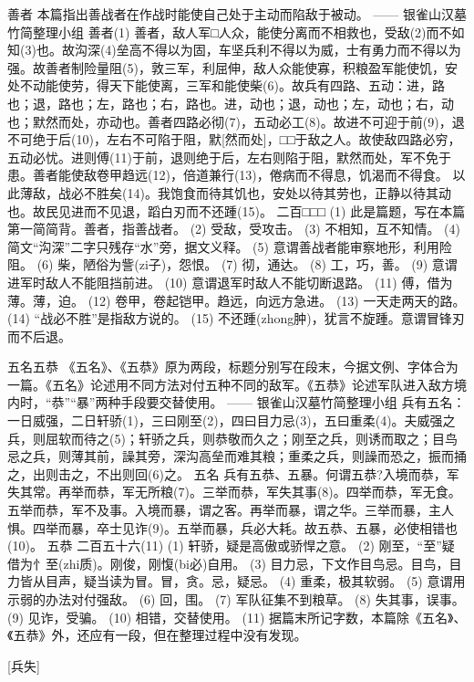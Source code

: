 \documentclass[12pt,UTF8]{ctexbook}
\begin{document}
善者
本篇指出善战者在作战时能使自己处于主动而陷敌于被动。
—— 银雀山汉墓竹简整理小组
善者(1)
善者，敌人军□人众，能使分离而不相救也，受敌(2)而不如知(3)也。故沟深(4)垒高不得以为固，车坚兵利不得以为威，士有勇力而不得以为强。故善者制险量阻(5)，敦三军，利屈伸，敌人众能使寡，积粮盈军能使饥，安处不动能使劳，得天下能使离，三军和能使柴(6)。故兵有四路、五动：进，路也；退，路也；左，路也；右，路也。进，动也；退，动也；左，动也；右，动也；默然而处，亦动也。善者四路必彻(7)，五动必工(8)。故进不可迎于前(9)，退不可绝于后(10)，左右不可陷于阻，默[然而处]，□□于敌之人。故使敌四路必穷，五动必忧。进则傅(11)于前，退则绝于后，左右则陷于阻，默然而处，军不免于患。善者能使敌卷甲趋远(12)，倍道兼行(13)，倦病而不得息，饥渴而不得食。
以此薄敌，战必不胜矣(14)。我饱食而待其饥也，安处以待其劳也，正静以待其动也。故民见进而不见退，蹈白刃而不还踵(15)。
二百□□□
(1) 此是篇题，写在本篇第一简简背。善者，指善战者。
(2) 受敌，受攻击。
(3) 不相知，互不知情。
(4) 简文“沟深”二字只残存“水”旁，据文义释。
(5) 意谓善战者能审察地形，利用险阻。
(6) 柴，陋俗为訾(zi子)，怨恨。
(7) 彻，通达。
(8) 工，巧，善。
(9) 意谓进军时敌人不能阻挡前进。
(10) 意谓退军时敌人不能切断退路。
(11) 傅，借为薄。薄，迫。
(12) 卷甲，卷起铠甲。趋远，向远方急进。
(13) 一天走两天的路。
(14) “战必不胜”是指敌方说的。
(15) 不还踵(zhong肿)，犹言不旋踵。意谓冒锋刃而不后退。

五名五恭
《五名》、《五恭》原为两段，标题分别写在段末，今据文例、字体合为一篇。《五名》论述用不同方法对付五种不同的敌军。《五恭》论述军队进入敌方境内时，“恭”“暴”两种手段要交替使用。
—— 银雀山汉墓竹简整理小组
兵有五名：一日威强，二日轩骄(1)，三曰刚至(2)，四曰{目力}忌(3)，五曰重柔(4)。夫威强之兵，则屈软而待之(5)；轩骄之兵，则恭敬而久之；刚至之兵，则诱而取之；{目鸟}忌之兵，则薄其前，譟其旁，深沟高垒而难其粮；重柔之兵，则譟而恐之，振而捅之，出则击之，不出则回(6)之。
五名
兵有五恭、五暴。何谓五恭?入境而恭，军失其常。再举而恭，军无所粮(7)。三举而恭，军失其事(8)。四举而恭，军无食。五举而恭，军不及事。入境而暴，谓之客。再举而暴，谓之华。三举而暴，主人惧。四举而暴，卒士见诈(9)。五举而暴，兵必大耗。故五恭、五暴，必使相错也(10)。
五恭 二百五十六(11)
(1) 轩骄，疑是高傲或骄悍之意。
(2) 刚至，“至”疑借为{忄至}(zhi质)。刚俊，刚愎(bi必)自用。
(3) {目力}忌，下文作{目鸟}忌。{目鸟}，{目力}皆从目声，疑当读为冒。冒，贪。忌，疑忌。
(4) 重柔，极其软弱。
(5) 意谓用示弱的办法对付强敌。
(6) 回，围。
(7) 军队征集不到粮草。
(8) 失其事，误事。
(9) 见诈，受骗。
(10) 相错，交替使用。
(11) 据篇末所记字数，本篇除《五名》、《五恭》外，还应有一段，但在整理过程中没有发现。

[兵失]
\end{document}
